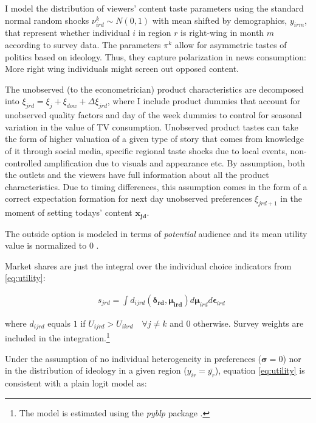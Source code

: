 \documentclass[12pt]{article}
\begin{document}
	I model the distribution of viewers' content taste parameters using the standard normal random shocks $ \nu_{ird}^k \sim N(0,1)$ with mean shifted by  demographics, $ y_{irm} $, that represent whether individual $i$ in region $r$ is right-wing in month $m$ according to survey data.	The parameters $\pi^k$ allow for asymmetric tastes of politics based on ideology. Thus, they capture polarization in news consumption: More right wing individuals might screen out opposed content. 

The unobserved (to the econometrician) product characteristics are decomposed into $\xi_{jrd}= \xi_j + \xi_{dow} + \Delta \xi_{jrd}$, where I include product dummies that account for unobserved quality factors and day of the week dummies to control for  seasonal variation in the value of TV consumption. Unobserved product tastes can take the form of higher valuation of a given type of story that comes from knowledge of it through social media, specific regional taste shocks due to local events, non-controlled amplification due to visuals and appearance etc. By assumption, both the outlets and the viewers have full information about all the product characteristics. Due to timing differences, this assumption comes in the form of a correct expectation formation for next day unobserved preferences $ \xi_{jrd+1}$ in the moment of setting todays' content $\bm{x_{jd}}$. 
	
	The outside option is modeled in terms of \textit{potential} audience  \citep{berry1994estimating} and its mean utility value is normalized to 0 .
	
	Market shares are just the integral over the individual choice indicators from \ref{eq:utility}:  
	
	
	\begin{equation}\label{eq:shares}
	\begin{aligned}
		& s_{jrd} = \int d_{ijrd}(\bm{\delta_{rd}},\bm{\mu_{ird}})d\bm{\mu}_{ird}d\bm{\epsilon}_{ird}
	\end{aligned} 
\end{equation} 
	
	where $d_{ijrd}$ equals $1$ if $U_{ijrd}>U_{ikrd} \quad \forall j\neq k$ and $0$ otherwise. Survey weights are included in the integration.\footnote{The model is estimated using the \textit{pyblp} package \citep{conlon2020best}.} 

Under the assumption of no individual heterogeneity in preferences  ($\bm{\sigma}=0$) nor in  the distribution of ideology in a given region ($y_{ir}= \bar{y_r}$),  equation \ref{eq:utility} is consistent with a plain logit model as:
\end{document}
